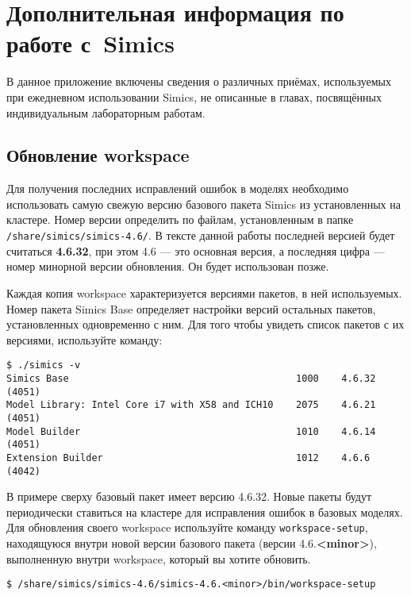 \appendix
\appendixpage

\chapter{Дополнительная информация по работе с~Simics} \label{chap:append01}

В данное приложение включены сведения о различных приёмах, используемых при ежедневном использовании Simics, не описанные в главах, посвящённых индивидуальным лабораторным работам.

\section{Обновление workspace}

Для получения последних исправлений ошибок в моделях необходимо использовать самую свежую версию базового пакета Simics из  установленных на кластере. Номер версии определить по файлам, установленным в папке \texttt{/share/simics/simics-4.6/}. В тексте данной работы последней версией будет считаться \textbf{4.6.32}, при этом 4.6 --- это основная версия, а последняя цифра --- номер минорной версии обновления. Он будет использован позже.

Каждая копия workspace характеризуется версиями пакетов, в ней используемых. Номер пакета Simics Base определяет настройки версий остальных пакетов, установленных одновременно с ним. Для того чтобы увидеть список пакетов с их версиями, используйте команду:

\begin{lstlisting}
$ ./simics -v
Simics Base                                        1000    4.6.32    (4051)
Model Library: Intel Core i7 with X58 and ICH10    2075    4.6.21    (4051)
Model Builder                                      1010    4.6.14    (4051)
Extension Builder                                  1012    4.6.6     (4042)
\end{lstlisting}

В примере сверху базовый пакет имеет версию 4.6.32. Новые пакеты будут периодически ставиться на кластере для исправления ошибок в базовых моделях. Для обновления своего workspace используйте команду \texttt{workspace-setup}, находящуюся внутри новой версии базового пакета (версии 4.6.\textbf{<minor>}), выполненную внутри workspace, который вы хотите обновить.

\begin{lstlisting}
$ /share/simics/simics-4.6/simics-4.6.<minor>/bin/workspace-setup
\end{lstlisting}

